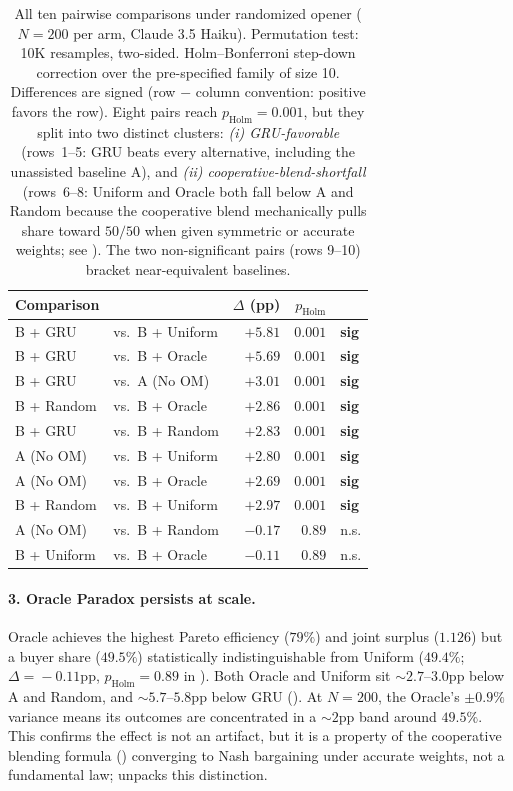 \documentclass[11pt,a4paper]{article}
\begin{document}
\begin{table}[t]
\centering
\caption{All ten pairwise comparisons under randomized opener ($N\!=\!200$ per arm, Claude 3.5 Haiku). Permutation test: 10K resamples, two-sided. Holm--Bonferroni step-down correction over the pre-specified family of size 10. Differences are signed (row $-$ column convention: positive favors the row). Eight pairs reach $p_\text{Holm}\!=\!0.001$, but they split into two distinct clusters: \emph{(i) GRU-favorable} (rows~1--5: GRU beats every alternative, including the unassisted baseline A), and \emph{(ii) cooperative-blend-shortfall} (rows~6--8: Uniform and Oracle both fall below A and Random because the cooperative blend mechanically pulls share toward $50/50$ when given symmetric or accurate weights; see ). The two non-significant pairs (rows 9--10) bracket near-equivalent baselines.}
\label{tab:holm}
\small
\begin{tabular}{llrrl}
\toprule
Comparison & & $\Delta$ (pp) & $p_\text{Holm}$ & \\
\midrule
B + GRU      & vs.\ B + Uniform & $+5.81$ & $0.001$ & \textbf{sig} \\
B + GRU      & vs.\ B + Oracle  & $+5.69$ & $0.001$ & \textbf{sig} \\
B + GRU      & vs.\ A (No OM)   & $+3.01$ & $0.001$ & \textbf{sig} \\
B + Random   & vs.\ B + Oracle  & $+2.86$ & $0.001$ & \textbf{sig} \\
B + GRU      & vs.\ B + Random  & $+2.83$ & $0.001$ & \textbf{sig} \\
A (No OM)    & vs.\ B + Uniform & $+2.80$ & $0.001$ & \textbf{sig} \\
A (No OM)    & vs.\ B + Oracle  & $+2.69$ & $0.001$ & \textbf{sig} \\
B + Random   & vs.\ B + Uniform & $+2.97$ & $0.001$ & \textbf{sig} \\
A (No OM)    & vs.\ B + Random  & $-0.17$ & $0.89$  & n.s. \\
B + Uniform  & vs.\ B + Oracle  & $-0.11$ & $0.89$  & n.s. \\
\bottomrule
\end{tabular}
\end{table}

\paragraph{3. Oracle Paradox persists at scale.} Oracle achieves the highest Pareto efficiency ($79\%$) and joint surplus ($1.126$) but a buyer share ($49.5\%$) statistically indistinguishable from Uniform ($49.4\%$; $\Delta\!=\!-0.11$pp, $p_\text{Holm}\!=\!0.89$ in ). Both Oracle and Uniform sit ${\sim}2.7$--$3.0$pp below A and Random, and ${\sim}5.7$--$5.8$pp below GRU (). At $N = 200$, the Oracle's $\pm 0.9\%$ variance means its outcomes are concentrated in a ${\sim}2$pp band around $49.5\%$. This confirms the effect is not an artifact, but it is a property of the cooperative blending formula () converging to Nash bargaining under accurate weights, not a fundamental law;  unpacks this distinction.
\end{document}

